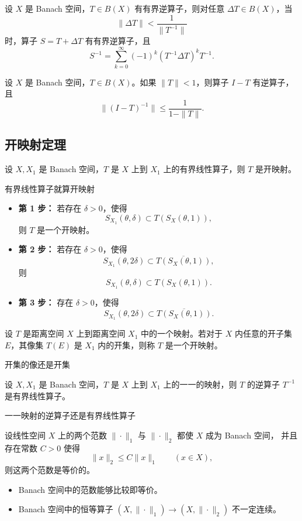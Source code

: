 \begin{corollary}[逆算子判定]
设 $X$ 是 Banach 空间，$T \in B(X)$ 有有界逆算子，则对任意 $\Delta T \in B(X)$，当
\[
\|\Delta T\| < \frac{1}{\|T^{-1}\|}
\]
时，算子 $S = T + \Delta T$ 有有界逆算子，且
\[
S^{-1} = \sum_{k=0}^{\infty} (-1)^k (T^{-1} \Delta T)^k T^{-1}.
\]
\end{corollary}

\begin{theorem}
设 $X$ 是 Banach 空间，$T \in B(X)$。如果 $\|T\| < 1$，则算子 $I - T$ 有逆算子，且
\[
\|(I - T)^{-1}\| \le \frac{1}{1 - \|T\| }.
\]
\end{theorem}
\subsection{开映射定理}
\begin{theorem}[开映射定理-完备+有界线性算子=开映射]
设 $X, X_1$ 是 Banach 空间，$T$ 是 $X$ 上到 $X_1$ 上的有界线性算子，则 $T$ 是开映射。
\end{theorem}
有界线性算子就算开映射
\begin{itemize}

  \item \textbf{第 1 步：} 若存在 $\delta>0$，使得
  \[
      S_{X_1}(\theta,\delta) \subset T(S_X(\theta,1)),
  \]
  则 $T$ 是一个开映射。

  \item \textbf{第 2 步：} 若存在 $\delta>0$，使得
  \[
      S_{X_1}(\theta,2\delta) \subset \overline{T(S_X(\theta,1))},
  \]
  则
  \[
      S_{X_1}(\theta,\delta) \subset T(S_X(\theta,1)).
  \]

  \item \textbf{第 3 步：} 存在 $\delta>0$，使得
  \[
      S_{X_1}(\theta,2\delta) \subset \overline{T(S_X(\theta,1))}.
  \]

\end{itemize}
\begin{definition}
设 $T$ 是距离空间 $X$ 上到距离空间 $X_1$ 中的一个映射。若对于 $X$ 内任意的开子集 $E$，其像集 $T(E)$ 是 $X_1$ 内的开集，则称 $T$ 是一个开映射。
\end{definition}
开集的像还是开集
\begin{theorem}
设 $X, X_1$ 是 Banach 空间，$T$ 是 $X$ 上到 $X_1$ 上的一一的映射，则 $T$ 的逆算子 $T^{-1}$ 是有界线性算子。
\end{theorem}
一一映射的逆算子还是有界线性算子
\begin{corollary}
设线性空间 $X$ 上的两个范数 $\|\cdot\|_1$ 与 $\|\cdot\|_2$ 都使 $X$ 成为 Banach 空间，
并且存在常数 $C>0$ 使得
\[
    \|x\|_2 \le C \|x\|_1 \qquad (x\in X),
\]
则这两个范数是等价的。

\begin{itemize}
    \item Banach 空间中的范数能够比较即等价。
    \item Banach 空间中的恒等算子 $(X,\|\cdot\|_1)\to (X,\|\cdot\|_2)$ 不一定连续。
\end{itemize}
\end{corollary}
